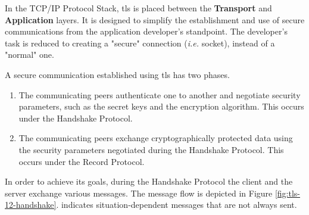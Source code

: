\documentclass[conference]{IEEEtran}
\begin{document}
In the TCP/IP Protocol Stack, \gls{tls} is placed between the \textbf{Transport}
and \textbf{Application} layers. It is designed to simplify the establishment
and use of secure communications from the application developer's standpoint.
The developer's task is reduced to creating a "secure" connection (\textit{i.e.} socket), instead of a "normal" one.

A secure communication established using \gls{tls} has two phases.

\begin{enumerate}
\item The communicating peers authenticate one to another and negotiate security parameters, such as the secret keys and the encryption algorithm. This occurs under the Handshake Protocol.
\item The communicating peers exchange cryptographically protected data
using the security parameters negotiated during the Handshake Protocol. This
occurs under the Record Protocol.
\end{enumerate}

In order to
achieve its goals, during the Handshake Protocol the client and the server
exchange various messages. The message flow is depicted in Figure \ref{fig:tls-12-handshake}. \codeword{*} indicates situation-dependent
messages that are not always sent.
\end{document}
